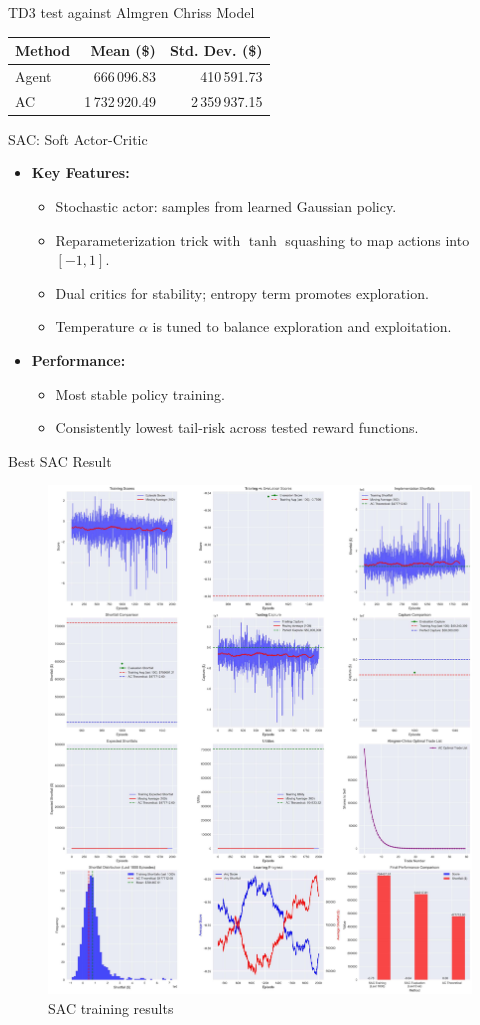 \documentclass[11pt,aspectratio=169]{beamer}   %
\begin{document}
\begin{frame}{TD3 test against Almgren Chriss Model}
	\begin{table}[ht]
		\centering
		\begin{tabular}{lrr}
			\hline
			\textbf{Method} & \textbf{Mean (\$)}  & \textbf{Std. Dev. (\$)} \\ 
			\hline
			Agent           &  666\,096.83         &   410\,591.73             \\ 
			AC              & 1\,732\,920.49       & 2\,359\,937.15            \\ 
			\hline
		\end{tabular}
	\end{table}
\end{frame}


\begin{frame}{SAC: Soft Actor-Critic}
	\begin{itemize}
		\item \textbf{Key Features:}
		\begin{itemize}
			\item Stochastic actor: samples from learned Gaussian policy.
			\item Reparameterization trick with $\tanh$ squashing to map actions into $[-1,1]$.
			\item Dual critics for stability; entropy term promotes exploration.
			\item Temperature $\alpha$ is tuned to balance exploration and exploitation.
		\end{itemize}
		\item \textbf{Performance:}
		\begin{itemize}
			\item Most stable policy training.
			\item Consistently lowest tail-risk across tested reward functions.
		\end{itemize}
	\end{itemize}
\end{frame}

\begin{frame}{Best SAC Result}
	\begin{figure}[ht]
		\centering
		\includegraphics[width=0.4\linewidth]{sac_comprehensive_results.pdf}
		\caption{SAC training results}
	\end{figure}
\end{frame}
\end{document}
